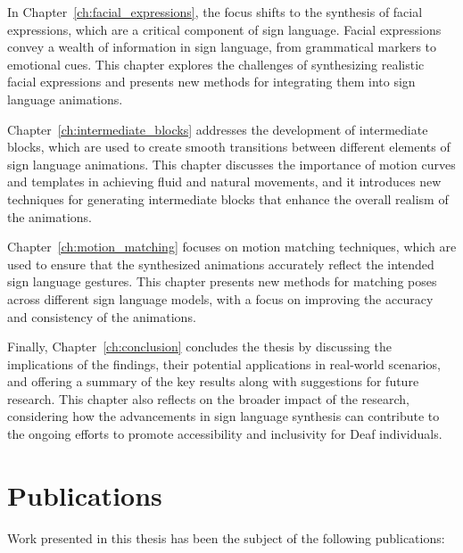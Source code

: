 \documentclass[../../main.tex]{subfiles}
\begin{document}
In Chapter~\ref{ch:facial_expressions}, the focus shifts to the synthesis of facial expressions, which are a critical component of sign language. Facial expressions convey a wealth of information in sign language, from grammatical markers to emotional cues. This chapter explores the challenges of synthesizing realistic facial expressions and presents new methods for integrating them into sign language animations.

Chapter~\ref{ch:intermediate_blocks} addresses the development of intermediate blocks, which are used to create smooth transitions between different elements of sign language animations. This chapter discusses the importance of motion curves and templates in achieving fluid and natural movements, and it introduces new techniques for generating intermediate blocks that enhance the overall realism of the animations.

Chapter~\ref{ch:motion_matching} focuses on motion matching techniques, which are used to ensure that the synthesized animations accurately reflect the intended sign language gestures. This chapter presents new methods for matching poses across different sign language models, with a focus on improving the accuracy and consistency of the animations.

Finally, Chapter~\ref{ch:conclusion} concludes the thesis by discussing the implications of the findings, their potential applications in real-world scenarios, and offering a summary of the key results along with suggestions for future research. This chapter also reflects on the broader impact of the research, considering how the advancements in sign language synthesis can contribute to the ongoing efforts to promote accessibility and inclusivity for Deaf individuals.

\section{Publications}

Work presented in this thesis has been the subject of the following publications:

\end{document}
